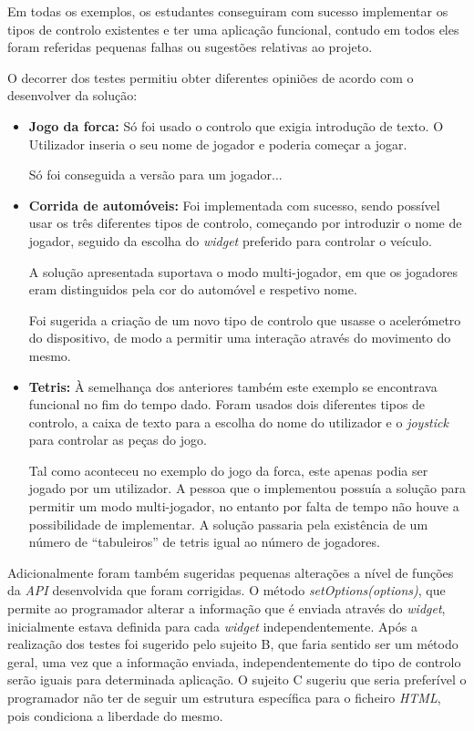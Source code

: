 	Em todas os exemplos, os estudantes conseguiram com sucesso implementar os tipos de controlo existentes e ter uma aplicação funcional, contudo em todos eles foram referidas pequenas falhas ou sugestões relativas ao projeto.

	O decorrer dos testes permitiu obter diferentes opiniões de acordo com o desenvolver da solução:

		\begin{itemize}
		\item \textbf{Jogo da forca: } Só foi usado o controlo que exigia introdução de texto. O Utilizador inseria o seu nome de jogador e poderia começar a jogar.

		Só foi conseguida a versão para um jogador...

		\item \textbf{Corrida de automóveis: } Foi implementada com sucesso, sendo possível usar os três diferentes tipos de controlo, começando por introduzir o nome de jogador, seguido da escolha do \textit{widget} preferido para controlar o veículo.

		A solução apresentada suportava o modo multi-jogador, em que os jogadores eram distinguidos pela cor do automóvel e respetivo nome.

		Foi sugerida a criação de um novo tipo de controlo que usasse o acelerómetro do dispositivo, de modo a permitir uma interação através do movimento do mesmo.

		\item \textbf{Tetris: } À semelhança dos anteriores também este exemplo se encontrava funcional no fim do tempo dado. Foram usados dois diferentes tipos de controlo, a caixa de texto para a escolha do nome do utilizador e o \textit{joystick} para controlar as peças do jogo. 

		Tal como aconteceu no exemplo do jogo da forca, este apenas podia ser jogado por um utilizador. A pessoa que o implementou possuía a solução para permitir um modo multi-jogador, no entanto por falta de tempo não houve a possibilidade de implementar. A solução passaria pela existência de um número de ``tabuleiros'' de tetris igual ao número de jogadores.

		\end{itemize}

	Adicionalmente foram também sugeridas pequenas alterações a nível de funções da \textit{API} desenvolvida que foram corrigidas. O método \textit{setOptions(options)}, que permite ao programador alterar a informação que é enviada através do \textit{widget}, inicialmente estava definida para cada \textit{widget} independentemente. Após a realização dos testes foi sugerido pelo sujeito B, que faria sentido ser um método geral, uma vez que a informação enviada, independentemente do tipo de controlo serão iguais para determinada aplicação.
	O sujeito C sugeriu que seria preferível o programador não ter de seguir um estrutura específica para o ficheiro \textit{HTML}, pois condiciona a liberdade do mesmo. 

